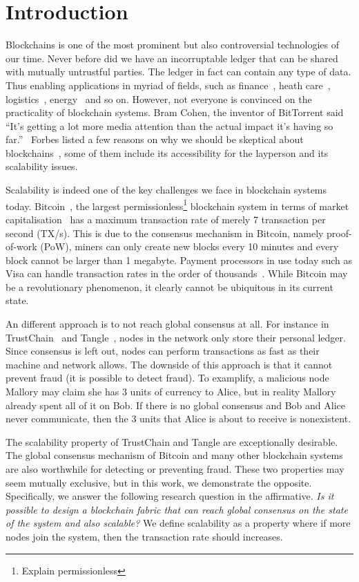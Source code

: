 \chapter{Introduction}
\label{ch:intro}

Blockchains is one of the most prominent but also controversial technologies of our time.
Never before did we have an incorruptable ledger that can be shared with mutually untrustful parties.
The ledger in fact can contain any type of data.
Thus enabling applications in myriad of fields,
such as finance~\cite{todo}, heath care~\cite{todo}, logistics~\cite{todo}, energy~\cite{todo} and so on.
However, not everyone is convinced on the practicality of blockchain systems.
Bram Cohen, the inventor of BitTorrent said
``It's getting a lot more media attention than the actual impact it's having so far.''~\cite{cohen}
Forbes listed a few reasons on why we should be skeptical about blockchains~\cite{forbes},
some of them include its accessibility for the layperson and its scalability issues.

Scalability is indeed one of the key challenges we face in blockchain systems today.
Bitcoin~\cite{bitcoin}, the largest permissionless\footnote{Explain permissionless} blockchain system
in terms of market capitalisation~\cite{bitcoinmarketcap} has a maximum transaction rate of merely 7 transaction per second (TX/s).
This is due to the consensus mechanism in Bitcoin, namely proof-of-work (PoW),
miners can only create new blocks every 10 minutes and every block cannot be larger than 1 megabyte.
Payment processors in use today such as Visa can handle transaction rates in the order of thousands~\cite{visa}.
While Bitcoin may be a revolutionary phenomenon, it clearly cannot be ubiquitous in its current state.

An different approach is to not reach global consensus at all.
For instance in TrustChain~\cite{multichain} and Tangle~\cite{tangle},
nodes in the network only store their personal ledger.
Since consensus is left out, nodes can perform transactions as fast as their machine and network allows.
The downside of this approach is that it cannot prevent fraud (it is possible to detect fraud).
To examplify, a malicious node Mallory may claim she has 3 units of currency to Alice,
but in reality Mallory already spent all of it on Bob.
If there is no global consensus and Bob and Alice never communicate,
then the 3 units that Alice is about to receive is nonexistent.

The scalability property of TrustChain and Tangle are exceptionally desirable.
The global consensus mechanism of Bitcoin and many other blockchain systems are also worthwhile for detecting or preventing fraud.
These two properties may seem mutually exclusive, but in this work, we demonstrate the opposite.
Specifically, we answer the following research question in the affirmative.
\emph{Is it possible to design a blockchain fabric that can reach global consensus on the state of the system 
and also scalable?} We define scalability as a property where if more nodes join the system, then the transaction rate should increases.

